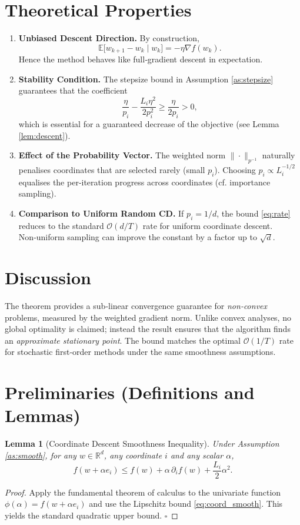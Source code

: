\documentclass{article}
\newtheorem{lemma}{Lemma}[section]
\begin{document}
\section*{Theoretical Properties}
\begin{enumerate}[label=\arabic*.]
\item \textbf{Unbiased Descent Direction.} By construction,
\[
\mathbb{E}\!\bigl[w_{k+1}-w_k\mid w_k\bigr]=-\eta\nabla f(w_k).
\]
Hence the method behaves like full‑gradient descent in expectation.

\item \textbf{Stability Condition.} The stepsize bound in Assumption \ref{as:stepsize} guarantees that the coefficient
\[
\frac{\eta}{p_i}-\frac{L_i\eta^{2}}{2p_i^{2}}\ge\frac{\eta}{2p_i}>0,
\]
which is essential for a guaranteed decrease of the objective (see Lemma \ref{lem:descent}).

\item \textbf{Effect of the Probability Vector.} The weighted norm $\|\cdot\|_{p^{-1}}$ naturally penalises coordinates that are selected rarely (small $p_i$).  Choosing $p_i\propto L_i^{-1/2}$ equalises the per‑iteration progress across coordinates (cf. importance sampling).

\item \textbf{Comparison to Uniform Random CD.} If $p_i=1/d$, the bound \eqref{eq:rate} reduces to the standard $\mathcal{O}(d/T)$ rate for uniform coordinate descent.  Non‑uniform sampling can improve the constant by a factor up to $\sqrt{d}$.

\end{enumerate}

\section*{Discussion}
The theorem provides a sub‑linear convergence guarantee for \emph{non‑convex} problems, measured by the weighted gradient norm.  Unlike convex analyses, no global optimality is claimed; instead the result ensures that the algorithm finds an \emph{approximate stationary point}.  The bound matches the optimal $\mathcal{O}(1/T)$ rate for stochastic first‑order methods under the same smoothness assumptions.

\section*{Preliminaries (Definitions and Lemmas)}
\begin{lemma}[Coordinate Descent Smoothness Inequality]
\label{lem:smooth}
Under Assumption \ref{as:smooth}, for any $w\in\mathbb{R}^{d}$, any coordinate $i$ and any scalar $\alpha$,
\[
f(w+\alpha e_i)\le f(w)+\alpha\,\partial_i f(w)+\frac{L_i}{2}\alpha^{2}.
\]
\end{lemma}
\begin{proof}
Apply the fundamental theorem of calculus to the univariate function $\phi(\alpha)=f(w+\alpha e_i)$ and use the Lipschitz bound \eqref{eq:coord_smooth}.  This yields the standard quadratic upper bound.  $\square$
\end{proof}
\end{document}
